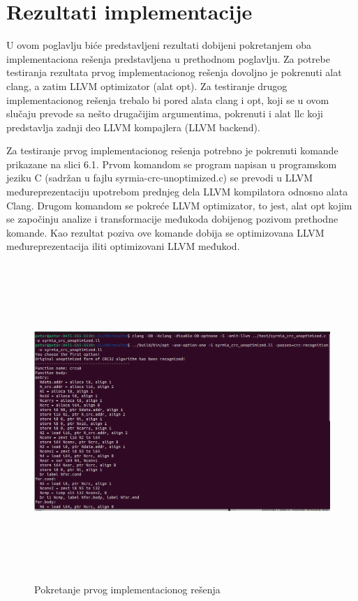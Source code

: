 \documentclass[12pt,oneside]{memoir}
\begin{document}
\chapter{Rezultati implementacije}
U ovom poglavlju biće predstavljeni rezultati dobijeni pokretanjem oba implementaciona rešenja 
predstavljena u prethodnom poglavlju. Za potrebe testiranja rezultata prvog implementacionog 
rešenja dovoljno je pokrenuti alat clang, a zatim LLVM optimizator (alat opt). Za 
testiranje drugog implementacionog rešenja trebalo bi pored alata clang i opt, koji se u ovom 
slučaju prevode sa nešto drugačijim argumentima, pokrenuti i alat llc koji predstavlja zadnji deo 
LLVM kompajlera (LLVM backend).  

Za testiranje prvog implementacionog rešenja potrebno je pokrenuti komande prikazane na slici 6.1.
Prvom komandom se program napisan u programskom jeziku C (sadržan u fajlu 
syrmia-crc-unoptimized.c) se prevodi u LLVM međureprezentaciju upotrebom prednjeg dela LLVM 
kompilatora odnosno alata Clang. Drugom komandom se pokreće LLVM optimizator, to jest, alat opt 
kojim se započinju analize i transformacije međukoda dobijenog pozivom prethodne komande. Kao 
rezultat poziva ove komande dobija se optimizovana LLVM međureprezentacija iliti optimizovani 
LLVM međukod. 

\begin{figure}
\includegraphics[width=\textwidth, height=12cm]{testing_1st_impl}
\caption{Pokretanje prvog implementacionog rešenja}
\end{figure}
\end{document}
